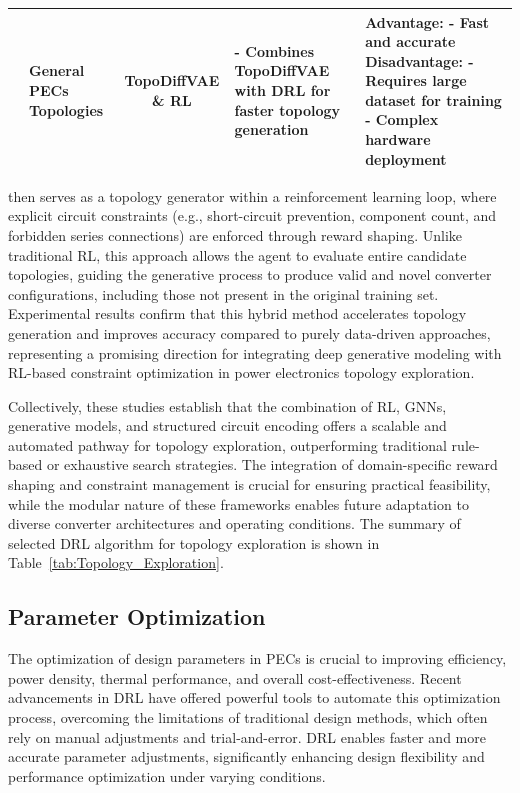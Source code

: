 \begin{table}[htbp]
{\begin{tabular}{@{}c p{2.5cm} c p{4.5cm} p{5cm}@{}}
\cite{xu2022power} & General PECs Topologies & TopoDiffVAE \& RL & 
- Combines TopoDiffVAE with DRL for faster topology generation & 
\textbf{Advantage:} \newline
- Fast and accurate \newline
\textbf{Disadvantage:} \newline
- Requires large dataset for training \newline
- Complex hardware deployment \\ 
\bottomrule
\end{tabular}
}
\end{table}



\noindent
then serves as a topology generator within a reinforcement learning loop, where explicit circuit constraints (e.g., short-circuit prevention, component count, and forbidden series connections) are enforced through reward shaping. Unlike traditional RL, this approach allows the agent to evaluate entire candidate topologies, guiding the generative process to produce valid and novel converter configurations, including those not present in the original training set. Experimental results confirm that this hybrid method accelerates topology generation and improves accuracy compared to purely data-driven approaches, representing a promising direction for integrating deep generative modeling with RL-based constraint optimization in power electronics topology exploration.

Collectively, these studies establish that the combination of RL, GNNs, generative models, and structured circuit encoding offers a scalable and automated pathway for topology exploration, outperforming traditional rule-based or exhaustive search strategies. The integration of domain-specific reward shaping and constraint management is crucial for ensuring practical feasibility, while the modular nature of these frameworks enables future adaptation to diverse converter architectures and operating conditions. The summary of selected DRL algorithm for topology exploration is shown in Table~\ref{tab:Topology_Exploration}.


\subsection{Parameter Optimization}
\label{sec:param_opt}

The optimization of design parameters in PECs is crucial to improving efficiency, power density, thermal performance, and overall cost-effectiveness. Recent advancements in DRL have offered powerful tools to automate this optimization process, overcoming the limitations of traditional design methods, which often rely on manual adjustments and trial-and-error. DRL enables faster and more accurate parameter adjustments, significantly enhancing design flexibility and performance optimization under varying conditions.

